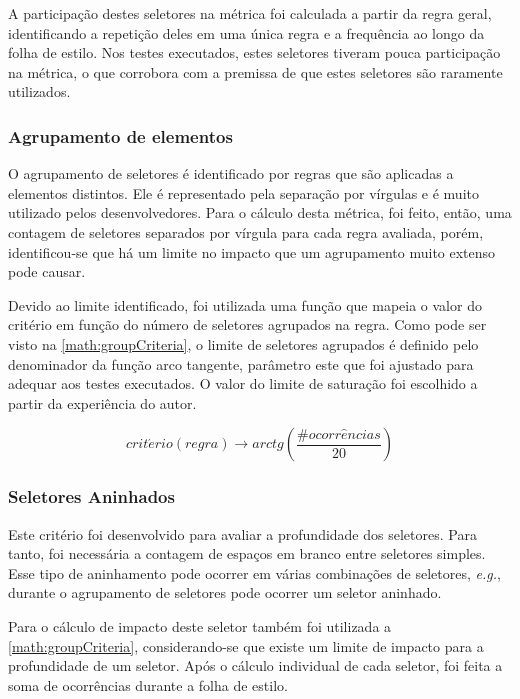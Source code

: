 A participação destes seletores na métrica foi calculada a partir da regra geral, identificando a repetição deles em uma única regra e a frequência ao longo da folha de estilo. Nos testes executados, estes seletores tiveram pouca participação na métrica, o que corrobora com a premissa de que estes seletores são raramente utilizados.

\subsubsection{Agrupamento de elementos}
O agrupamento de seletores é identificado por regras que são aplicadas a elementos distintos. Ele é representado pela separação por vírgulas e é muito utilizado pelos desenvolvedores. Para o cálculo desta métrica, foi feito, então, uma contagem de seletores separados por vírgula para cada regra avaliada, porém, identificou-se que há um limite no impacto que um agrupamento muito extenso pode causar. 

Devido ao limite identificado, foi utilizada uma função que mapeia o valor do critério em função do número de seletores agrupados na regra. Como pode ser visto na \autoref{math:groupCriteria}, o limite de seletores agrupados é definido pelo denominador da função arco tangente, parâmetro este que foi ajustado para adequar aos testes executados. O valor do limite de saturação foi escolhido a partir da experiência do autor.

\begin{equation}
\label{math:groupCriteria}
	crit\acute{e}rio(regra) \rightarrow arctg\left(\frac{\#ocorr\hat{e}ncias}{20}\right)	
\end{equation}

\subsubsection{Seletores Aninhados}
Este critério foi desenvolvido para avaliar a profundidade dos seletores. Para tanto, foi necessária a contagem de espaços em branco entre seletores simples. Esse tipo de aninhamento pode ocorrer em várias combinações de seletores, \textit{e.g.}, durante o agrupamento de seletores pode ocorrer um seletor aninhado.

Para o cálculo de impacto deste seletor também foi utilizada a \autoref{math:groupCriteria}, considerando-se que existe um limite de impacto para a profundidade de um seletor. Após o cálculo individual de cada seletor, foi feita a soma de ocorrências durante a folha de estilo.

